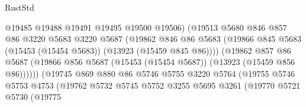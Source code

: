 \begin{lexlean}{RustStd}
\begin{coremodule}
                                      @19485
                                      @19488
                                      @19491
                                      @19495
                                      @19500
                                      @19506)
                                    (@19513
                                      @5680
                                      @846
                                      @857
                                      @86
                                      @3220
                                      @5683
                                      @3220
                                      @5687
                                      (@19862
                                        @846
                                        @86
                                        @5683
                                        (@19866
                                          @845
                                          @5683
                                          (@15453 (@15454 @5683))
                                          (@13923 (@15459 @845 @86))))
                                      (@19862
                                        @857
                                        @86
                                        @5687
                                        (@19866
                                          @856
                                          @5687
                                          (@15453 (@15454 @5687))
                                          (@13923 (@15459 @856 @86))))))
                                  (@19745
                                    @869
                                    @880
                                    @86
                                    @5746
                                    @5755
                                    @3220
                                    @5764
                                    (@19755
                                      @5746
                                      @5753
                                      @4753
                                      (@19762
                                        @5732
                                        @5745
                                        @5752
                                        @3255
                                        @5695
                                        @3261
                                        (@19770
                                          @5721
                                          @5730
                                          (@19775

\end{coremodule}
\end{lexlean}
